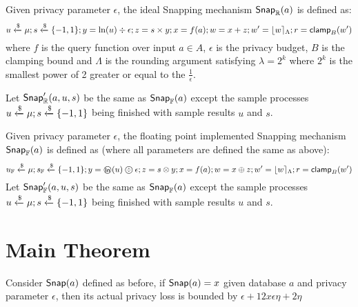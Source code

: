 \documentclass[a4paper,11pt]{article}
\begin{document}
\begin{defn}
Given privacy parameter $\epsilon$, the ideal Snapping mechanism $\mathsf{Snap}_{\mathbb{R}}(a)$ is defined as:
\[
	u \xleftarrow{\$} \mu; s \xleftarrow{\$} \{-1, 1\}; y = \ln (u) \div \epsilon; z = s \times y; x = f(a); w = x + z; w' = \lfloor w \rceil_{\Lambda}; r = \mathsf{clamp}_B (w')
\]
where $f$ is the query function over input $a \in A$, $\epsilon$ is the privacy budget, $B$ is the clamping bound and $\Lambda$ is the rounding argument satisfying $\lambda = 2^k$ where $2^k$ is the smallest power of 2 greater or equal to the $\frac{1}{\epsilon}$.
%

%
Let $\mathsf{Snap}_{\mathbb{R}}'(a, u, s)$ be the same as $\mathsf{Snap}_{\mathbb{F}}(a)$ except the sample processes $u \xleftarrow{\$} \mu; s \xleftarrow{\$} \{-1, 1\}$ being finished with sample results $u$ and $s$.
\end{defn}


\begin{defn}
Given privacy parameter $\epsilon$, the floating point implemented Snapping mechanism $\mathsf{Snap}_{\mathbb{F}}(a)$ is defined as (where all parameters are defined the same as above):
\[
	u_{\mathbb{F}} \xleftarrow{\$} \edistr; s_{\mathbb{F}} \samplel \{-1, 1\}; y = \oln (u) \odiv \epsilon; z = s \otimes y; x = f(a); w = x \oplus z; w' = \round{w}_{\Lambda}; r = \clamp_B (w')
\]
Let $\mathsf{Snap}_{\mathbb{F}}'(a, u, s)$ be the same as $\mathsf{Snap}_{\mathbb{F}}(a)$ except the sample processes $u \xleftarrow{\$} \mu; s \xleftarrow{\$} \{-1, 1\}$ being finished with sample results $u$ and $s$.
\end{defn}




\section{Main Theorem}

\begin{thm}
Consider $\mathsf{Snap}(a)$ defined as before, if $\mathsf{Snap}(a) = x$ given database $a$ and privacy parameter $\epsilon$, then its actual privacy loss is bounded by $\epsilon + 12 x \epsilon \eta + 2\eta$
\end{thm}
\end{document}
